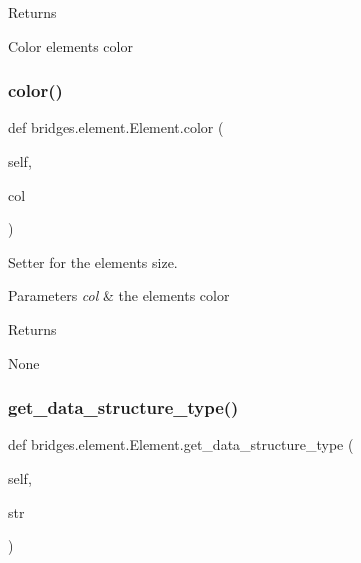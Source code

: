 \begin{DoxyReturn}{Returns}


Color element\textquotesingle{}s color 
\end{DoxyReturn}
\mbox{\label{classbridges_1_1element_1_1_element_ace59b1eb4cf0d775e9afa31605183c50}} 
\subsubsection{\texorpdfstring{color()}{color()}\hspace{0.1cm}{\footnotesize\ttfamily [2/2]}}
{\footnotesize\ttfamily def bridges.\+element.\+Element.\+color (\begin{DoxyParamCaption}\item[{}]{self,  }\item[{}]{col }\end{DoxyParamCaption})}



Setter for the element\textquotesingle{}s size. 


\begin{DoxyParams}{Parameters}
{\em col} & the element\textquotesingle{}s color \\
\hline
\end{DoxyParams}
\begin{DoxyReturn}{Returns}


None 
\end{DoxyReturn}
\mbox{\label{classbridges_1_1element_1_1_element_a87b8c79123d20eb2af48ae4e4f1bcf32}} 
\subsubsection{\texorpdfstring{get\+\_\+data\+\_\+structure\+\_\+type()}{get\_data\_structure\_type()}}
{\footnotesize\ttfamily def bridges.\+element.\+Element.\+get\+\_\+data\+\_\+structure\+\_\+type (\begin{DoxyParamCaption}\item[{}]{self,  }\item[{}]{str }\end{DoxyParamCaption})}



